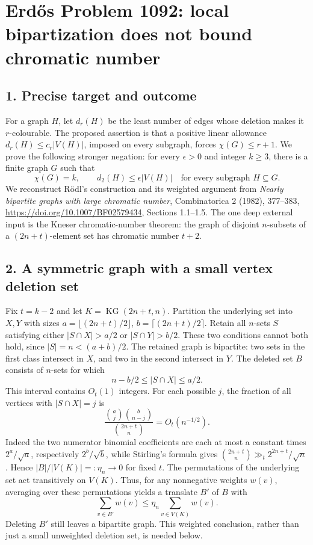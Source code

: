 \section*{Erd\H{o}s Problem 1092: local bipartization does not bound chromatic number}
\subsection*{1. Precise target and outcome}
For a graph $H$, let $d_r(H)$ be the least number of edges whose deletion makes it $r$-colourable. The proposed assertion is that a positive linear allowance $d_r(H)\le c_r|V(H)|$, imposed on every subgraph, forces $\chi(G)\le r+1$. We prove the following stronger negation: for every $\epsilon>0$ and integer $k\ge3$, there is a finite graph $G$ such that
\[
 \chi(G)=k,\qquad d_2(H)\le\epsilon|V(H)|\quad\text{for every subgraph }H\subseteq G.
\]
We reconstruct R\"odl's construction and its weighted argument from \emph{Nearly bipartite graphs with large chromatic number}, Combinatorica 2 (1982), 377--383, \url{https://doi.org/10.1007/BF02579434}, Sections 1.1--1.5. The one deep external input is the Kneser chromatic-number theorem: the graph of disjoint $n$-subsets of a $(2n+t)$-element set has chromatic number $t+2$.

\subsection*{2. A symmetric graph with a small vertex deletion set}
Fix $t=k-2$ and let $K=\operatorname{KG}(2n+t,n)$. Partition the underlying set into $X,Y$ with sizes $a=\lfloor(2n+t)/2\rfloor$, $b=\lceil(2n+t)/2\rceil$. Retain all $n$-sets $S$ satisfying either $|S\cap X|>a/2$ or $|S\cap Y|>b/2$. These two conditions cannot both hold, since $|S|=n<(a+b)/2$. The retained graph is bipartite: two sets in the first class intersect in $X$, and two in the second intersect in $Y$.
The deleted set $B$ consists of $n$-sets for which
\[
 n-b/2\le |S\cap X|\le a/2.
\]
This interval contains $O_t(1)$ integers. For each possible $j$, the fraction of all vertices with $|S\cap X|=j$ is
\[
 \frac{\binom aj\binom b{n-j}}{\binom{2n+t}n}=O_t(n^{-1/2}).
\]
Indeed the two numerator binomial coefficients are each at most a constant times $2^a/\sqrt a$, respectively $2^b/\sqrt b$, while Stirling's formula gives $\binom{2n+t}n\gg_t2^{2n+t}/\sqrt n$. Hence $|B|/|V(K)|=:\eta_n\to0$ for fixed $t$.
The permutations of the underlying set act transitively on $V(K)$. Thus, for any nonnegative weights $w(v)$, averaging over these permutations yields a translate $B'$ of $B$ with
\[
 \sum_{v\in B'}w(v)\le\eta_n\sum_{v\in V(K)}w(v).
\]
Deleting $B'$ still leaves a bipartite graph. This weighted conclusion, rather than just a small unweighted deletion set, is needed below.

